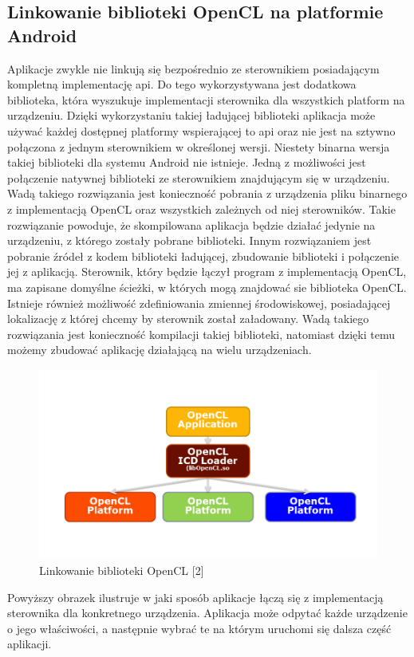 \subsection{Linkowanie biblioteki OpenCL na platformie Android}
Aplikacje zwykle nie linkują się bezpośrednio ze sterownikiem posiadającym kompletną implementację api. Do tego wykorzystywana jest dodatkowa biblioteka, która wyszukuje implementacji sterownika dla wszystkich platform na urządzeniu. Dzięki wykorzystaniu takiej ładującej biblioteki aplikacja może używać każdej dostępnej platformy wspierającej to api oraz nie jest na sztywno połączona z jednym sterownikiem w określonej wersji.
Niestety binarna wersja takiej biblioteki dla systemu Android nie istnieje. Jedną z możliwości jest połączenie natywnej biblioteki ze sterownikiem znajdującym się w urządzeniu. Wadą takiego rozwiązania jest konieczność pobrania z urządzenia pliku binarnego z implementacją OpenCL oraz wszystkich zależnych od niej sterowników. Takie rozwiązanie powoduje, że skompilowana aplikacja będzie działać jedynie na urządzeniu, z którego zostały pobrane biblioteki.
Innym rozwiązaniem jest pobranie źródeł z kodem biblioteki ładującej, zbudowanie biblioteki i połączenie jej z aplikacją. Sterownik, który będzie łączył program z implementacją OpenCL, ma zapisane domyślne ścieżki, w których mogą znajdować sie biblioteka OpenCL. Istnieje również możliwość zdefiniowania zmiennej środowiskowej, posiadającej lokalizację z której chcemy by sterownik został załadowany. Wadą takiego rozwiązania jest konieczność kompilacji takiej biblioteki, natomiast dzięki temu możemy zbudować aplikację działającą na wielu urządzeniach.
\begin{figure}[H]
	\includegraphics[scale=0.4]{imgs/icdLoader.png}
	\caption{Linkowanie biblioteki OpenCL [2]}
\end{figure}
Powyższy obrazek ilustruje w jaki sposób aplikacje łączą się z implementacją sterownika dla konkretnego urządzenia. Aplikacja może odpytać każde urządzenie o jego właściwości, a następnie wybrać te na którym uruchomi się dalsza część aplikacji.

